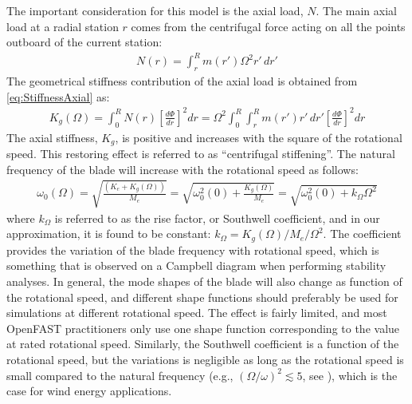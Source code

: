 \documentclass[wes, manuscript]{copernicus}
\begin{document}
The important consideration for this model is the axial load, $N$.
The main axial load at a radial station $r$ comes from the centrifugal force acting on all the points outboard of the current station:
\begin{align}
    N(r)=\int_r^R m(r') \Omega^2  r' \, dr'
\end{align}
The geometrical stiffness contribution of the axial load is obtained from \autoref{eq:StiffnessAxial} as:
\begin{align}
    K_g(\Omega) = \int_0^R N(r) \left[\frac{d\Phi}{dr} \right]^2  dr  
    = \Omega^2 \int_0^R \int_r^R m(r') r' \, dr'
 \left[\frac{d\Phi}{dr} \right]^2 dr  
 \label{eq:GeomStiffCentri}
\end{align}
% 
The axial stiffness, $K_g$, is positive and increases with the square of the rotational speed. 
This restoring effect is referred to as ``centrifugal stiffening''.
The natural frequency of the blade will increase with the rotational speed as follows:
\begin{align}
   \omega_0(\Omega)=\sqrt{\frac{(K_{e}+ K_g(\Omega))}{M_e}} 
   = \sqrt{ \omega_0^2(0) + \frac{K_g(\Omega)}{M_e} } 
   = \sqrt{ \omega_0^2(0) +  k_\Omega \Omega^2 } 
\end{align}
where $k_\Omega$ is referred to as the rise factor, or Southwell coefficient, and in our approximation, it is found to be constant: $k_\Omega=K_g(\Omega)/M_e/\Omega^2$.
The coefficient provides the variation of the blade frequency with rotational speed, which is something that is observed on a Campbell diagram when performing stability analyses.
In general, the mode shapes of the blade will also change as function of the rotational speed, and different shape functions should preferably be used for simulations at different rotational speed.
The effect is fairly limited, and most OpenFAST practitioners only use one shape function corresponding to the value at rated rotational speed.
Similarly, the Southwell coefficient is a function of the rotational speed, but the variations is negligible as long as the rotational speed is small compared to the natural frequency (e.g., $(\Omega/\omega)^2 \lesssim 5$, see \cite{bielawa:2006:book}), which is the case for wind energy applications.
\end{document}
